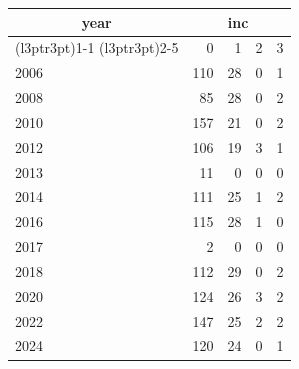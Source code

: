 \footnotesize\begin{tabular}[t]{lrrrr}
\toprule
\multicolumn{1}{c}{year} & \multicolumn{4}{c}{inc} \\
\cmidrule(l{3pt}r{3pt}){1-1} \cmidrule(l{3pt}r{3pt}){2-5}
  & 0 & 1 & 2 & 3\\
\midrule
2006 & 110 & 28 & 0 & 1\\
2008 & 85 & 28 & 0 & 2\\
2010 & 157 & 21 & 0 & 2\\
2012 & 106 & 19 & 3 & 1\\
2013 & 11 & 0 & 0 & 0\\
2014 & 111 & 25 & 1 & 2\\
2016 & 115 & 28 & 1 & 0\\
2017 & 2 & 0 & 0 & 0\\
2018 & 112 & 29 & 0 & 2\\
2020 & 124 & 26 & 3 & 2\\
2022 & 147 & 25 & 2 & 2\\
2024 & 120 & 24 & 0 & 1\\
\bottomrule
\end{tabular}
